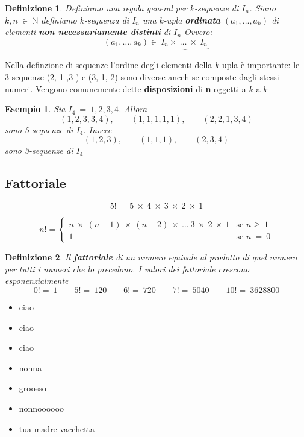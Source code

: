 \documentclass[12pt, a4paper]{article}
\theoremstyle{break}
\newtheorem{defn}{Definizione}
\theoremstyle{lemma}
\theoremstyle{lemma}
\theoremstyle{lemma}
\newtheorem{esem}{Esempio}
\begin{document}
\begin{defn}
  Definiamo una regola general per $k$-sequenze di $I_n$.
  Siano $k,n\ \in\ \mathbb{N}$ definiamo $k$-sequenza di $I_n$ una $k$-upla \textbf{ordinata} $(a_1,\ldots ,a_k)$ di elementi \textbf{non necessariamente distinti} di $I_n$ Ovvero:
  \begin{equation}
    (a_1,\ldots,a_k)\in\ \underbrace{I_n\times\ \ldots\ \times\ I_n\ }
  \end{equation}
\end{defn}

Nella definzione di sequenze l'ordine degli elementi della $k$-upla è importante: le 3-sequenze (2, 1 ,3 ) e (3, 1, 2) sono diverse anceh se composte dagli stessi numeri. Vengono comunemente dette \textbf{disposizioni} di \textbf{n} oggetti a $k$ a $k$

\begin{esem}
  Sia $I_4\ =\ {1,2,3,4}$. Allora
  \begin{equation}
    (1,2,3,3,4),\qquad (1,1,1,1,1),\qquad (2,2,1,3,4)
  \end{equation}
  sono 5-sequenze di $I_4$. Invece
  \begin{equation}
    (1,2,3),\qquad (1,1,1),\qquad (2,3,4)
  \end{equation}
  sono 3-sequenze di $I_4$
\end{esem}

\subsection{Fattoriale}

\begin{equation}
  5!=\ 5\ \times\ 4\ \times\ 3\ \times\ 2\ \times\ 1
\end{equation}

\begin{equation}
  n!=
  \begin{cases}
    n\ \times\ (n-1)\ \times\ (n-2)\ \times\ \ldots\ 3\ \times\ 2\
    \times\ 1 &  \mbox{se } n\geq\ 1 \\
    1 &  \mbox{se }n\ =\ 0
  \end{cases}
\end{equation}

\begin{defn}
  Il \textbf{fattoriale} di un numero equivale al prodotto di quel numero per tutti i numeri che lo precedono. I valori dei fattoriale crescono esponenzialmente
  \begin{equation}
    0!=\ 1 \qquad 5!=\ 120 \qquad 6!=\ 720 \qquad 7!=\ 5040 \qquad 10!=\ 3628800
  \end{equation}
\end{defn}

\begin{itemize}
	\item ciao
	\item ciao
	\item ciao
	\item nonna
	\item groosso 
	\item nonnoooooo
	\item tua madre vacchetta
		
\end{itemize}
\end{document}
